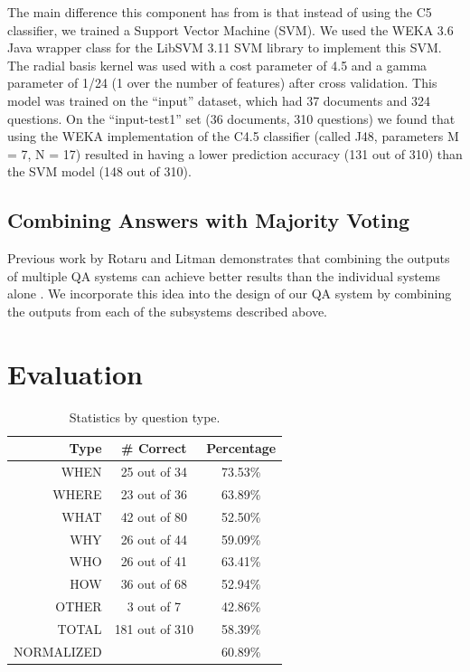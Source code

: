 \documentclass[11pt,letterpaper]{article}
\begin{document}
 The main difference this component has from \cite{Ng00amachine} is that instead of using the C5 classifier, 
 we trained a Support Vector Machine (SVM).  We used the WEKA 3.6 \cite{Hall_theweka} Java wrapper 
 class for the LibSVM 3.11 \cite{Chang01libsvm:a} SVM library to implement this SVM.  The 
 radial basis kernel was used with a cost parameter of 4.5 and a gamma parameter of 1/24 (1 over the number 
 of features) after cross validation.   This model was trained on the ``input'' dataset, which had 37 documents 
 and 324 questions.  On the ``input-test1'' set (36 documents, 310 questions) we found that using the WEKA 
 implementation of the C4.5 classifier (called J48, parameters M = 7, N = 17) resulted in having a lower 
 prediction accuracy (131 out of 310) than the SVM model (148 out of 310).


\subsection{Combining Answers with Majority Voting}
Previous work by Rotaru and Litman demonstrates that combining
the outputs of multiple QA systems can achieve better results than the
individual systems alone \cite{rotaru2005}. We incorporate this idea
into the design of our QA system by combining the outputs from each of
the subsystems described above.


\section{Evaluation}
\label{sec:evaluation}


\begin{table}
\centering

	\begin{tabular}{|r|c|c|}
	\hline
	Type   & \# Correct & Percentage \\
	\hline
	\hline
	WHEN   &  25 out of  34 &  73.53\% \\
	\hline
	WHERE  &  23 out of  36 &  63.89\% \\
	\hline
	WHAT   &  42 out of  80 &  52.50\% \\
	\hline
	WHY    &  26 out of  44 &  59.09\% \\
	\hline
	WHO    &  26 out of  41 &  63.41\% \\
	\hline
	HOW    &  36 out of  68 &  52.94\% \\
	\hline
	OTHER  &   3 out of   7 &  42.86\% \\
	\hline
	\hline
	TOTAL  & 181 out of 310 &  58.39\% \\
	\tiny{NORMALIZED}  &  &  60.89\% \\
	\hline
	\end{tabular}

\caption{Statistics by question type.}
\label{table:question-types}
\end{table}
\end{document}
